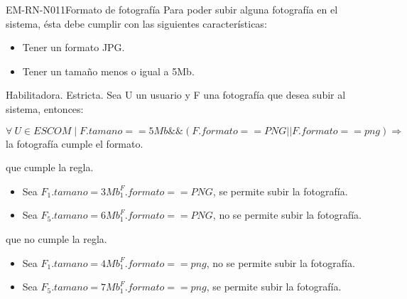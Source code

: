 \begin{BussinesRule}{EM-RN-N011}{Formato de fotografía}
	\BRitem[Descripción:] Para poder subir alguna fotografía en el sistema, ésta debe
	cumplir con las siguientes características: 
		\begin{itemize}
			\item Tener un formato JPG. 
			\item Tener un tamaño menos o igual a 5Mb.
		\end{itemize}
	\BRitem[Tipo: ] Habilitadora.
	\BRitem[Nivel: ] Estricta.
	\BRitem[Sentencia : ] Sea U un usuario y F una 
	fotografía que desea subir al sistema, entonces:
	\begin{center}
		$\forall \: U \in ESCOM \mid F.tamano == 5Mb \&\& (F.formato == PNG || F.formato == png) \Rightarrow$ la fotografía cumple el formato.
	\end{center}
	 que cumple la regla.
		\begin{itemize}
			\item Sea $F_{1}.tamano = 3Mb ^ F_{1}.formato == PNG$, se permite
			subir la fotografía.
			\item Sea $F_{5}.tamano = 6Mb ^ F_{1}.formato == PNG$, no se permite
			subir la fotografía.
		\end{itemize}
	 que no cumple la regla.
		\begin{itemize}
			\item Sea $F_{1}.tamano = 4Mb ^ F_{1}.formato == png$, no se permite
			subir la fotografía.
			\item Sea $F_{5}.tamano = 7Mb ^ F_{1}.formato == png$, se permite
			subir la fotografía.
		\end{itemize}

\end{BussinesRule}



